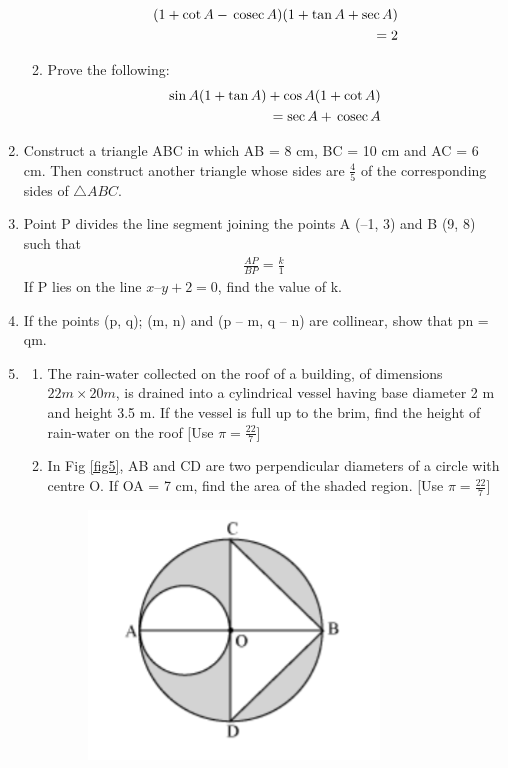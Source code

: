 \documentclass[journal,12pt,twocolumn]{IEEEtran}
\renewcommand\thesection{\arabic{section}}
\begin{document}
\begin{enumerate}[label=\thesection.\arabic*.,ref=\thesection.\theenumi]
\begin{enumerate}
\begin{align}
(1+\cot A - \,\text{cosec}\, A)(1 + \tan A + \sec A) \nonumber \\=2 \nonumber
\end{align}
\item Prove the following:
\begin{align}
\sin A(1+\tan A)+\cos A (1+\cot A)  \nonumber \\ = \sec A + \,\text{cosec}\, A \nonumber
\end{align}
\end{enumerate}
\item Construct a triangle ABC in which AB = 8 cm, BC = 10 cm and AC = 6 cm. Then construct another triangle whose sides are $\frac{4}{5}$ of the corresponding sides of $\triangle ABC$. \\
\item Point P divides the line segment joining the points A (–1, 3) and B (9, 8) such  that
\begin{align}
\frac{AP}{BP}=\frac{k}{1} \nonumber
\end{align}
If P lies on the line $x–y+2=0$, find the value of k. \\
\item If the points (p, q); (m, n) and (p – m, q – n) are collinear, show that pn = qm. \\
\item \begin{enumerate}
\item The rain-water collected on the roof of a building, of dimensions $22 m \times 20 m$, is drained into a cylindrical vessel having base diameter 2 m and height 3.5 m. If the vessel is full up to the brim, find the height of rain-water on the roof [Use $\pi = \frac{22}{7}$] \\
\item In Fig \ref{fig5}, AB and CD are two perpendicular diameters of a circle with centre O. If OA = 7 cm, find the area of the shaded region. [Use $\pi=\frac{22}{7}$]
\begin{figure}[h!]
    \centering
    \includegraphics[width=0.5\columnwidth,center]{./fig/5.png}

\end{figure}
\end{enumerate}
\end{enumerate}
\end{document}
